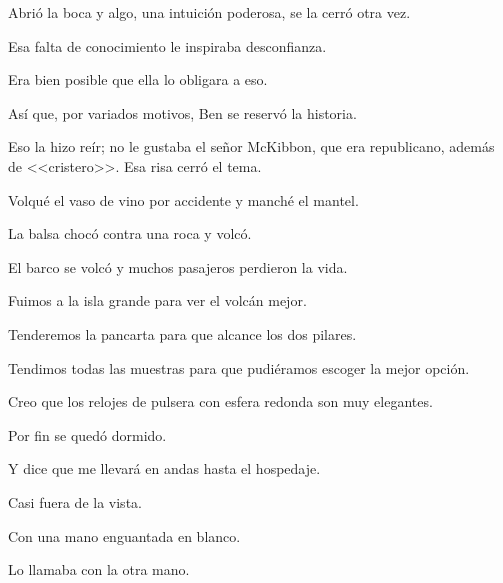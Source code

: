 \sk
Abrió la boca y algo, una intuición poderosa,
se la cerró otra vez.

\sk
Esa falta de conocimiento le
inspiraba desconfianza. 

\sk
Era bien posible que ella lo obligara a eso.

\sk
Así que, por variados motivos, Ben se reservó
la historia.

\sk
Eso la hizo reír; no le gustaba el señor
McKibbon, que era republicano, además de
<<cristero>>. Esa risa cerró el tema.

\sk
Volqué el vaso de vino por accidente y manché el mantel. 

\sk
La balsa chocó contra una roca y volcó. 

\sk
El barco se volcó y muchos pasajeros perdieron la vida. 

\sk
Fuimos a la isla grande para ver el volcán mejor. 

\sk
Tenderemos la pancarta para que alcance los dos pilares. 

\sk
Tendimos todas las muestras para que pudiéramos escoger la mejor opción. 

\sk
Creo que los relojes de pulsera con esfera redonda son muy elegantes. 

\sk
Por fin se quedó dormido. 

\sk
Y dice que me llevará en andas hasta el hospedaje.

\sk
Casi fuera de la vista. 

\sk
Con una mano enguantada en blanco. 

\sk
Lo llamaba con la otra mano. 

